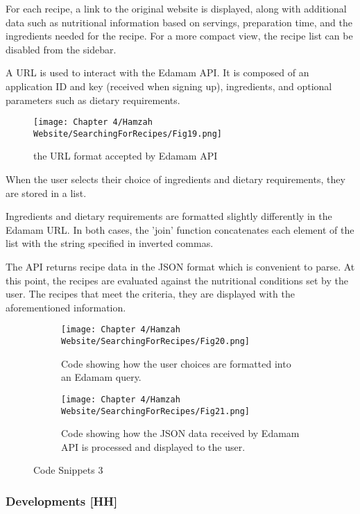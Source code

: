 For each recipe, a link to the original website is displayed, along with additional data such as nutritional information based on servings, preparation time, and the ingredients needed for the recipe.
For a more compact view, the recipe list can be disabled from the sidebar.

A URL is used to interact with the Edamam API.
It is composed of an application ID and key (received when signing up), ingredients, and optional parameters such as dietary requirements.

\begin{figure}[H]        
    \centering
    \texttt{[image: Chapter 4/Hamzah Website/SearchingForRecipes/Fig19.png]}
    \caption{the URL format accepted by Edamam API}
\end{figure} 

When the user selects their choice of ingredients and dietary requirements, they are stored in a list.

Ingredients and dietary requirements are formatted slightly differently in the Edamam URL.
In both cases, the 'join' function concatenates each element of the list with the string specified in inverted commas.

The API returns recipe data in the JSON format which is convenient to parse.
At this point, the recipes are evaluated against the nutritional conditions set by the user.
The recipes that meet the criteria, they are displayed with the aforementioned information.

\begin{figure}[H]
    \begin{subfigure}{.5\textwidth}
        \centering
        \texttt{[image: Chapter 4/Hamzah Website/SearchingForRecipes/Fig20.png]}
        \caption{Code showing how the user choices are formatted into an Edamam query.}
    \end{subfigure}%
    \begin{subfigure}{.5\textwidth}
        \centering
        \texttt{[image: Chapter 4/Hamzah Website/SearchingForRecipes/Fig21.png]}
        \caption{Code showing how the JSON data received by Edamam API is processed and displayed to the user.}
    \end{subfigure}
    \caption{Code Snippets 3}
\end{figure}

\subsubsection{Developments [HH]}

